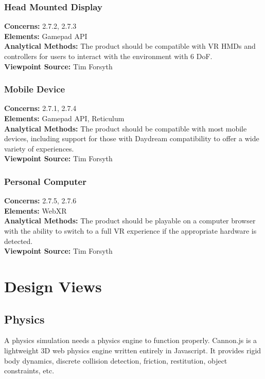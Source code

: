 \documentclass[onecolumn, draftclsnofoot,10pt, compsoc]{IEEEtran}
\begin{document}
\subsubsection{Head Mounted Display}
\textbf{Concerns:} 2.7.2, 2.7.3\\
\textbf{Elements:} Gamepad API\\
\textbf{Analytical Methods:} The product should be compatible with VR HMDs and controllers for users to interact with the environment with 6 DoF.\\
\textbf{Viewpoint Source:} Tim Forsyth

\subsubsection{Mobile Device}
\textbf{Concerns:} 2.7.1, 2.7.4\\
\textbf{Elements:} Gamepad API, Reticulum\\
\textbf{Analytical Methods:} The product should be compatible with most mobile devices, including support for those with Daydream compatibility to offer a wide variety of experiences.\\
\textbf{Viewpoint Source:} Tim Forsyth

\subsubsection{Personal Computer}
\textbf{Concerns:} 2.7.5, 2.7.6\\
\textbf{Elements:} WebXR\\
\textbf{Analytical Methods:} The product should be playable on a computer browser with the ability to switch to a full VR experience if the appropriate hardware is detected.\\
\textbf{Viewpoint Source:} Tim Forsyth

\section{Design Views}

\subsection{Physics}
A physics simulation needs a physics engine to function properly. Cannon.js is a lightweight 3D web physics engine written entirely in Javascript. It provides rigid body dynamics, discrete collision detection, friction, restitution, object constraints, etc.
\end{document}
